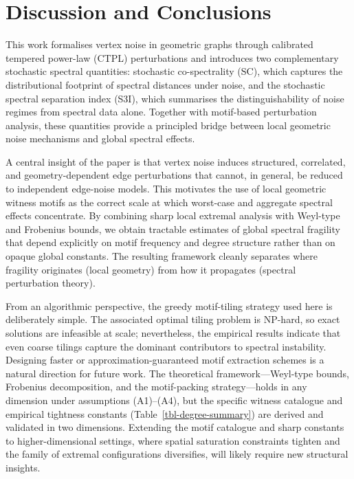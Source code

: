 \documentclass[
  11pt,
  letterpaper]{siamart251216}
\begin{document}
\section{Discussion and Conclusions}\label{sec-discussion}

This work formalises vertex noise in geometric graphs through calibrated
tempered power-law (CTPL) perturbations and introduces two complementary
stochastic spectral quantities: stochastic co-spectrality (\ac{SC}),
which captures the distributional footprint of spectral distances under
noise, and the stochastic spectral separation index (\ac{S3I}), which
summarises the distinguishability of noise regimes from spectral data
alone. Together with motif-based perturbation analysis, these quantities
provide a principled bridge between local geometric noise mechanisms and
global spectral effects.

A central insight of the paper is that vertex noise induces structured,
correlated, and geometry-dependent edge perturbations that cannot, in
general, be reduced to independent edge-noise models. This motivates the
use of local geometric witness motifs as the correct scale at which
worst-case and aggregate spectral effects concentrate. By combining
sharp local extremal analysis with Weyl-type and Frobenius bounds, we
obtain tractable estimates of global spectral fragility that depend
explicitly on motif frequency and degree structure rather than on opaque
global constants. The resulting framework cleanly separates where
fragility originates (local geometry) from how it propagates (spectral
perturbation theory).

From an algorithmic perspective, the greedy motif-tiling strategy used
here is deliberately simple. The associated optimal tiling problem is
NP-hard, so exact solutions are infeasible at scale; nevertheless, the
empirical results indicate that even coarse tilings capture the dominant
contributors to spectral instability. Designing faster or
approximation-guaranteed motif extraction schemes is a natural direction
for future work. The theoretical framework---Weyl-type bounds, Frobenius
decomposition, and the motif-packing strategy---holds in any dimension
under assumptions (A1)--(A4), but the specific witness catalogue and
empirical tightness constants (Table~\ref{tbl-degree-summary}) are
derived and validated in two dimensions. Extending the motif catalogue
and sharp constants to higher-dimensional settings, where spatial
saturation constraints tighten and the family of extremal configurations
diversifies, will likely require new structural insights.
\end{document}

